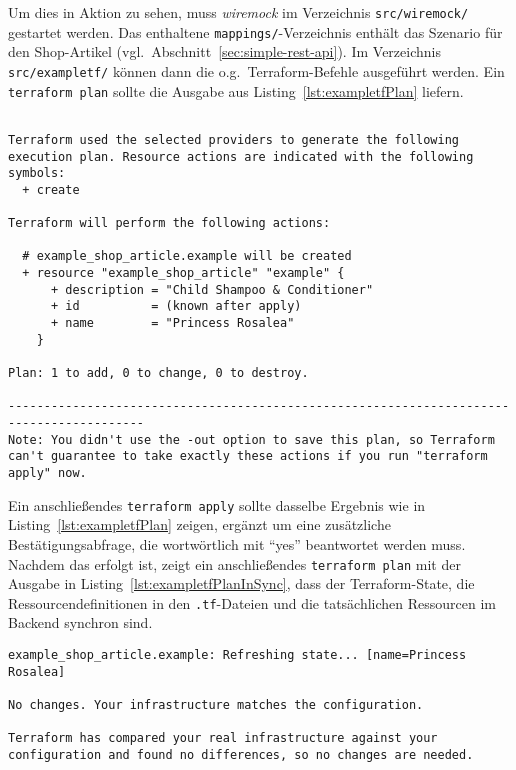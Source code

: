 \documentclass[paper=a4,11pt,numbers=noenddot]{article}
\begin{document}
Um dies in Aktion zu sehen, muss \emph{wiremock} im Verzeichnis \verb'src/wiremock/' gestartet werden. Das enthaltene \verb'mappings/'-Verzeichnis enthält das Szenario für den Shop-Artikel (vgl.\ Abschnitt~\ref{sec:simple-rest-api}). Im Verzeichnis \verb'src/exampletf/' können dann die o.g.\ Terraform-Befehle ausgeführt werden. Ein \verb'terraform plan' sollte die Ausgabe aus Listing~\ref{lst:exampletfPlan} liefern.

\begin{lstlisting}[label=lst:exampletfPlan]

Terraform used the selected providers to generate the following execution plan. Resource actions are indicated with the following symbols:
  + create

Terraform will perform the following actions:

  # example_shop_article.example will be created
  + resource "example_shop_article" "example" {
      + description = "Child Shampoo & Conditioner"
      + id          = (known after apply)
      + name        = "Princess Rosalea"
    }

Plan: 1 to add, 0 to change, 0 to destroy.

-----------------------------------------------------------------------------------------
Note: You didn't use the -out option to save this plan, so Terraform can't guarantee to take exactly these actions if you run "terraform apply" now.

\end{lstlisting}

Ein anschließendes \verb'terraform apply' sollte dasselbe Ergebnis wie in Listing~\ref{lst:exampletfPlan} zeigen, ergänzt um eine zusätzliche Bestätigungsabfrage, die wortwörtlich mit ``yes'' beantwortet werden muss. Nachdem das erfolgt ist, zeigt ein anschließendes \verb'terraform plan' mit der Ausgabe in Listing~\ref{lst:exampletfPlanInSync}, dass der Terraform-State, die Ressourcendefinitionen in den \verb'.tf'-Dateien und die tatsächlichen Ressourcen im Backend synchron sind.

\begin{lstlisting}[label=lst:exampletfPlanInSync]
example_shop_article.example: Refreshing state... [name=Princess Rosalea]

No changes. Your infrastructure matches the configuration.

Terraform has compared your real infrastructure against your configuration and found no differences, so no changes are needed.
\end{lstlisting}
\end{document}
